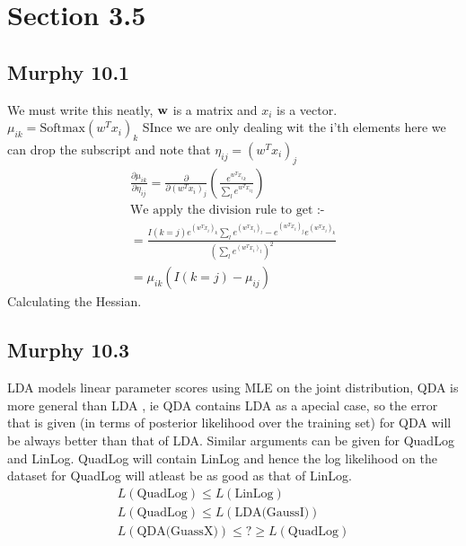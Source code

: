 \section{Section 3.5}

\subsection{Murphy 10.1}
We must write this neatly, $\vb{w}$ is a matrix and $x_i $ is a vector.
$\mu_{ik} = \text{Softmax}(w^T x_i)_k$ SInce we are only dealing wit the i'th elements here
we can drop the subscript and note that $\eta_{ij} = (w^Tx_i)_j$
\begin{align}
    \frac{\partial \mu_{ik}}{\partial \eta_{ij} } = \frac{\partial}{\partial (w^Tx_i)_j } (\frac{e^{{w^Tx_i}_k}}{\sum_l e^{{w^Tx_i}_l}}) \\
    \text{We apply the division rule to get :-} \\
    = \frac{I(k = j)e^{(w^Tx_i)_k}\sum_l e^{(w^Tx_i)_l} - e^{(w^Tx_i)_j}e^{(w^Tx_i)_k}}{(\sum_l e^{(w^Tx_i)_l})^2} \\ 
    = \mu_{ik} (I( k = j) - \mu_{ij})
\end{align}
Calculating the Hessian.


\subsection{Murphy 10.3}
LDA models linear parameter scores using MLE on the joint distribution, QDA is more general than
LDA , ie QDA contains LDA as a apecial case, so the error that is given (in terms of posterior likelihood over the training set)
for QDA will be always better than that of LDA. Similar arguments can be given for QuadLog and LinLog. QuadLog will contain LinLog and
hence the log likelihood on the dataset for QuadLog will atleast be as good as that of LinLog.
\begin{gather}
    L(\text{QuadLog}) \le L(\text{LinLog}) \\
    L(\text{QuadLog}) \le L(\text{LDA(GaussI)}) \\
    L(\text{QDA(GuassX)}) \le  ? \ge L(\text{QuadLog}) \\
\end{gather}